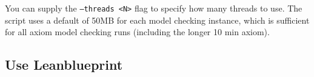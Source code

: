 You can supply the \texttt{--threads <N>} flag to specify how many threads
to use.
The script uses a default of 50MB for each model checking instance, which
is sufficient for all axiom model checking runs (including the longer 10 min
axiom).






\subsection{Use Leanblueprint}

